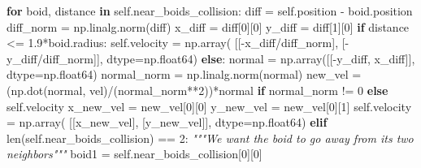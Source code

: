 \documentclass[
]{article}
\newenvironment{Shaded}{}{}
\newcommand{\BuiltInTok}[1]{#1}
\newcommand{\CommentTok}[1]{\textcolor[rgb]{0.38,0.63,0.69}{\textit{#1}}}
\newcommand{\ControlFlowTok}[1]{\textcolor[rgb]{0.00,0.44,0.13}{\textbf{#1}}}
\newcommand{\DecValTok}[1]{\textcolor[rgb]{0.25,0.63,0.44}{#1}}
\newcommand{\FloatTok}[1]{\textcolor[rgb]{0.25,0.63,0.44}{#1}}
\newcommand{\KeywordTok}[1]{\textcolor[rgb]{0.00,0.44,0.13}{\textbf{#1}}}
\newcommand{\NormalTok}[1]{#1}
\newcommand{\OperatorTok}[1]{\textcolor[rgb]{0.40,0.40,0.40}{#1}}
\newcommand{\VariableTok}[1]{\textcolor[rgb]{0.10,0.09,0.49}{#1}}
\begin{document}
\begin{Shaded}
\begin{Highlighting}[]
            \ControlFlowTok{for}\NormalTok{ boid, distance }\KeywordTok{in} \VariableTok{self}\NormalTok{.near\_boids\_collision:}
\NormalTok{                diff }\OperatorTok{=} \VariableTok{self}\NormalTok{.position }\OperatorTok{{-}}\NormalTok{ boid.position}
\NormalTok{                diff\_norm }\OperatorTok{=}\NormalTok{ np.linalg.norm(diff)}
\NormalTok{                x\_diff }\OperatorTok{=}\NormalTok{ diff[}\DecValTok{0}\NormalTok{][}\DecValTok{0}\NormalTok{]}
\NormalTok{                y\_diff }\OperatorTok{=}\NormalTok{ diff[}\DecValTok{1}\NormalTok{][}\DecValTok{0}\NormalTok{]}
                \ControlFlowTok{if}\NormalTok{ distance }\OperatorTok{\textless{}=} \FloatTok{1.9}\OperatorTok{*}\NormalTok{boid.radius:}
                    \VariableTok{self}\NormalTok{.velocity }\OperatorTok{=}\NormalTok{ np.array(}
\NormalTok{                        [[}\OperatorTok{{-}}\NormalTok{x\_diff}\OperatorTok{/}\NormalTok{diff\_norm], [}\OperatorTok{{-}}\NormalTok{y\_diff}\OperatorTok{/}\NormalTok{diff\_norm]], dtype}\OperatorTok{=}\NormalTok{np.float64)}
                \ControlFlowTok{else}\NormalTok{:}
\NormalTok{                    normal }\OperatorTok{=}\NormalTok{ np.array([[}\OperatorTok{{-}}\NormalTok{y\_diff, x\_diff]], dtype}\OperatorTok{=}\NormalTok{np.float64)}
\NormalTok{                    normal\_norm }\OperatorTok{=}\NormalTok{ np.linalg.norm(normal)}
\NormalTok{                    new\_vel }\OperatorTok{=}\NormalTok{ (np.dot(normal, vel)}\OperatorTok{/}\NormalTok{(normal\_norm}\OperatorTok{**}\DecValTok{2}\NormalTok{))}\OperatorTok{*}\NormalTok{normal }\ControlFlowTok{if}\NormalTok{ normal\_norm }\OperatorTok{!=} \DecValTok{0} \ControlFlowTok{else} \VariableTok{self}\NormalTok{.velocity}
\NormalTok{                    x\_new\_vel }\OperatorTok{=}\NormalTok{ new\_vel[}\DecValTok{0}\NormalTok{][}\DecValTok{0}\NormalTok{]}
\NormalTok{                    y\_new\_vel }\OperatorTok{=}\NormalTok{ new\_vel[}\DecValTok{0}\NormalTok{][}\DecValTok{1}\NormalTok{]}
                    \VariableTok{self}\NormalTok{.velocity }\OperatorTok{=}\NormalTok{ np.array(}
\NormalTok{                        [[x\_new\_vel], [y\_new\_vel]], dtype}\OperatorTok{=}\NormalTok{np.float64)}
        \ControlFlowTok{elif} \BuiltInTok{len}\NormalTok{(}\VariableTok{self}\NormalTok{.near\_boids\_collision) }\OperatorTok{==} \DecValTok{2}\NormalTok{:}
            \CommentTok{"""We want the boid to go away from it\textquotesingle{}s two neighbors"""}
\NormalTok{            boid1 }\OperatorTok{=} \VariableTok{self}\NormalTok{.near\_boids\_collision[}\DecValTok{0}\NormalTok{][}\DecValTok{0}\NormalTok{]}

\end{Highlighting}
\end{Shaded}
\end{document}
